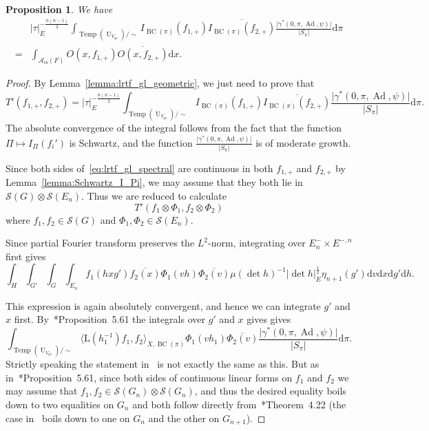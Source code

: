 \documentclass[letterpaper,11pt]{amsart}
\newcommand{\cA}{\mathcal{A}}
\newcommand{\cS}{\mathcal{S}}
\newcommand{\rd}{\mathrm{d}}
\newcommand{\<}{\negthickspace}
\providecommand{\abs}[1]{\lvert#1\rvert}
\DeclareMathOperator{\U}{U}
\DeclareMathOperator{\BC}{BC}
\DeclareMathOperator{\Ad}{Ad}
\DeclareMathOperator{\Temp}{Temp} \DeclareMathOperator{\temp}{temp}
\DeclareMathOperator{\rs}{rs}
\theoremstyle{definition}
\theoremstyle{plain}
\newtheorem{prop}[definition]{Proposition}
\theoremstyle{remark}
\numberwithin{equation}{section}
\begin{document}
\begin{prop}    \label{prop:lrtf_gl}
We have
    \[
    \begin{aligned}
    &\abs{\tau}_E^{-\frac{n(n-1)}{2}}
    \int_{\Temp(\U_{V_{qs}})/\sim} I_{\BC(\pi)}(f_{1, +})
    \overline{I_{\BC(\pi)}(f_{2, +})}
    \frac{\abs{\gamma^*(0,\pi, \Ad, \psi)}}{\abs{S_{\pi}}} \rd \pi\\
    = &
    \int_{\cA_{\rs}(F)} O(x, f_{1, +})
    \overline{O(x, f_{2, +})} \rd x.
    \end{aligned}
    \]
\end{prop}

\begin{proof}
By Lemma~\ref{lemma:lrtf_gl_geometric}, we just need to prove that
    \begin{equation}    \label{eq:lrtf_gl_spectral}
    T'(f_{1, +}, f_{2, +}) = \abs{\tau}_E^{-\frac{n(n-1)}{2}}
    \int_{\Temp(\U_{V_{qs}})/\sim} I_{\BC(\pi)}(f_{1, +})
    \overline{I_{\BC(\pi)}(f_{2, +})}
    \frac{\abs{\gamma^*(0,\pi, \Ad, \psi)}}{\abs{S_{\pi}}} \rd \pi.
    \end{equation}
The absolute convergence of the integral follows from the fact that the
function $\Pi \mapsto I_\Pi(f_i')$ is Schwartz, and the function
$\frac{\abs{\gamma^*(0,\pi, \Ad, \psi)}}{\abs{S_{\pi}}}$ is of moderate
growth.

Since both sides of~\eqref{eq:lrtf_gl_spectral} are continuous in both $f_{1,
+}$ and $f_{2, +}$ by Lemma~\ref{lemma:Schwartz_I_Pi}, we may assume that
they both lie in $\cS(G) \otimes \cS(E_n)$. Thus we are reduced to calculate
    \[
    T'(f_1 \otimes \Phi_1, f_2 \otimes \Phi_2)
    \]
where $f_1, f_2 \in \cS(G)$ and $\Phi_1, \Phi_2 \in \cS(E_n)$.


Since partial Fourier transform preserves the $L^2$-norm, integrating over
$E_n^- \times E^{-, n}$ first gives
    \[
    \int_{H} \int_{G'} \int_{G} \int_{E_n}
    f_1(h x g') \overline{f_2(x)}
    \Phi_1(v h)
    \overline{\Phi_2(v)}
    \mu(\det h)^{-1} \abs{\det h}_E^{\frac{1}{2}}
    \eta_{n+1}(g') \rd v \rd x \rd g' \rd h.
    \]

This expression is again absolutely convergent, and hence we can integrate
$g'$ and $x$ first. By~\cite{BP1}*{Proposition~5.61} the integrals over $g'$
and $x$ gives gives
    \[
    \int_{\Temp(\U_{V_{qs}})/\sim}
    \langle \mathrm{L}(h_1^{-1})f_1, f_2\rangle_{X, \BC(\pi)}
    \Phi_1(v h_1)
    \overline{\Phi_2(v)}
    \frac{\abs{\gamma^*(0,\pi, \Ad, \psi)}}{\abs{S_{\pi}}}
    \rd \pi.
    \]
Strictly speaking the statement in~\cite{BP1} is not exactly the same as
this. But as in~\cite{BP1}*{Proposition~5.61}, since both sides of continuous
linear forms on $f_1$ and $f_2$ we may assume that $f_1, f_2 \in \cS(G_n)
\otimes \cS(G_n)$, and thus the desired equality boils down to two equalities
on $G_n$ and both follow directly from~\cite{BP1}*{Theorem~4.22} (the case
in~\cite{BP1} boils down to one on $G_n$ and the other on $G_{n+1}$).


\end{proof}
\end{document}
